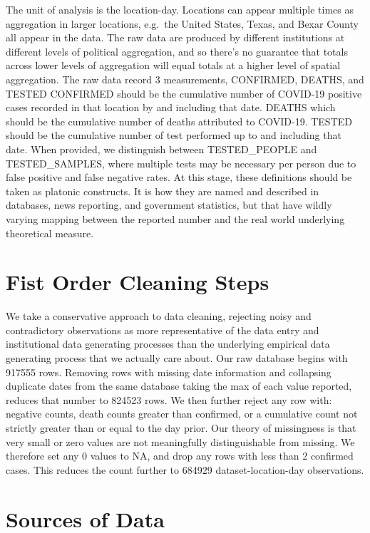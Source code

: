 \documentclass[
]{book}
\begin{document}
The unit of analysis is the location-day. Locations can appear multiple times as aggregation in larger locations, e.g.~the United States, Texas, and Bexar County all appear in the data. The raw data are produced by different institutions at different levels of political aggregation, and so there's no guarantee that totals across lower levels of aggregation will equal totals at a higher level of spatial aggregation. The raw data record 3 measurements, CONFIRMED, DEATHS, and TESTED CONFIRMED should be the cumulative number of COVID-19 positive cases recorded in that location by and including that date. DEATHS which should be the cumulative number of deaths attributed to COVID-19. TESTED should be the cumulative number of test performed up to and including that date. When provided, we distinguish between TESTED\_PEOPLE and TESTED\_SAMPLES, where multiple tests may be necessary per person due to false positive and false negative rates. At this stage, these definitions should be taken as platonic constructs. It is how they are named and described in databases, news reporting, and government statistics, but that have wildly varying mapping between the reported number and the real world underlying theoretical measure.

\hypertarget{fist-order-cleaning-steps}{%
\section{Fist Order Cleaning Steps}\label{fist-order-cleaning-steps}}

We take a conservative approach to data cleaning, rejecting noisy and contradictory observations as more representative of the data entry and institutional data generating processes than the underlying empirical data generating process that we actually care about. Our raw database begins with 917555 rows. Removing rows with missing date information and collapsing duplicate dates from the same database taking the max of each value reported, reduces that number to 824523 rows. We then further reject any row with: negative counts, death counts greater than confirmed, or a cumulative count not strictly greater than or equal to the day prior. Our theory of missingness is that very small or zero values are not meaningfully distinguishable from missing. We therefore set any 0 values to NA, and drop any rows with less than 2 confirmed cases. This reduces the count further to 684929 dataset-location-day observations.

\hypertarget{sources-of-data}{%
\section{Sources of Data}\label{sources-of-data}}
\end{document}
